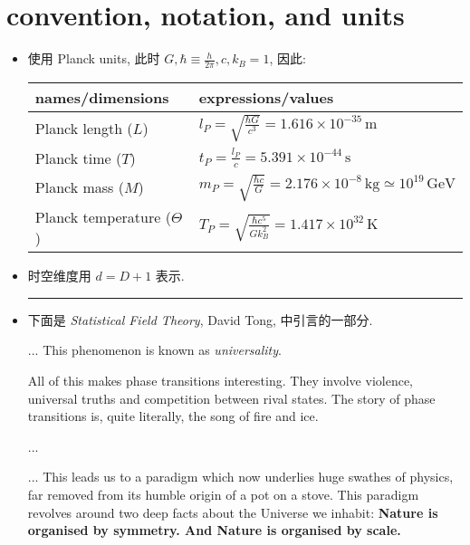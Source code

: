 \chapter*{convention, notation, and units}
\begin{itemize}
	\item 使用 Planck units, 此时 $G, \hbar \equiv \frac{h}{2 \pi}, c, k_B = 1$, 因此:
	
	\begin{center}
		\begin{tabularx}{\linewidth}{XX}
			\toprule 
			names/dimensions & expressions/values \\
			\midrule 
			Planck length ($L$) & $l_P = \sqrt{\frac{\hbar G}{c^3}} = 1.616 \times 10^{- 35} \, \text{m}$ \\
			Planck time ($T$) & $t_P = \frac{l_P}{c} = 5.391 \times 10^{- 44} \, \text{s}$ \\
			Planck mass ($M$) & $m_P = \sqrt{\frac{\hbar c}{G}} = 2.176 \times 10^{- 8} \, \text{kg} \simeq 10^{19} \, \text{GeV}$ \\
			Planck temperature ($\Theta$) & $T_P = \sqrt{\frac{\hbar c^5}{G k_B^2}} = 1.417 \times 10^{32} \, \text{K}$ \\
			\bottomrule
		\end{tabularx}
	\end{center}
	
	\item 时空维度用 $d = D + 1$ 表示.
	
	\noindent\rule[0.5ex]{\linewidth}{0.5pt} %
	
	\item 下面是 \textit{Statistical Field Theory}, David Tong, 中引言的一部分.
	
	\begin{tcolorbox}
		... This phenomenon is known as \textit{universality}.
		
		All of this makes phase transitions interesting. They involve violence, universal truths
		and competition between rival states. The story of phase transitions is, quite literally,
		the song of fire and ice.
		
		...
		
		... This leads us to a paradigm which now underlies huge swathes of physics, far removed from its humble origin of a pot on a stove. This paradigm revolves around two deep facts about the Universe we inhabit: \textbf{Nature is organised by symmetry. And Nature is organised by scale.}
	\end{tcolorbox}
	

\end{itemize}
